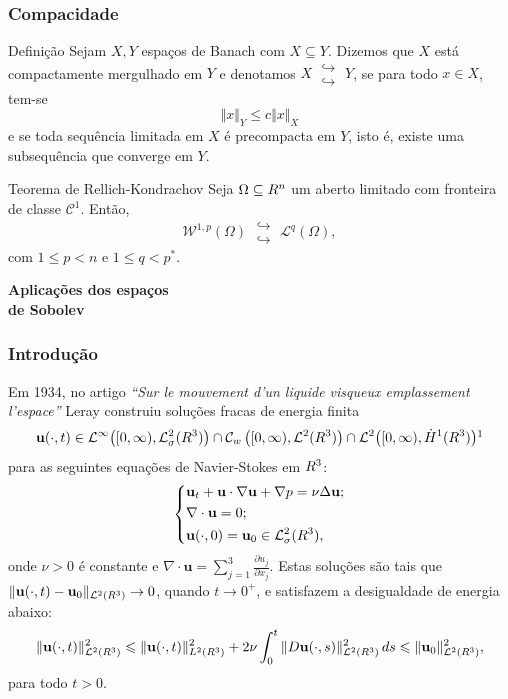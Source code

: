\documentclass[xcolor=dvipsnames, aspectratio=169, 10pt]{beamer}
\let\mathbb\relax
\newcommand{\bR}{\mathbb{R}}
\newcommand{\bu}{\mathbf{u}}
\newcommand{\cC}{\mathcal{C}}
\newcommand{\cL}{\mathcal{L}}
\newcommand{\cW}{\mathcal{W}}
\newcommand{\doublehookrightarrow}{\;\substack{\hookrightarrow \\ \hookrightarrow}\;}
\begin{document}
\begin{frame}
    \frametitle{Compacidade}
    \begin{block}{Definição}
        Sejam $X, Y$ espaços de Banach com $X \subseteq Y$. Dizemos que $X$ está compactamente mergulhado em $Y$ e denotamos $X \doublehookrightarrow Y$,
        se para todo $x \in X$, tem-se
        \[
            \Vert x \Vert_{Y} \leqslant c \Vert x \Vert_X
        \]
        e se toda sequência limitada em $X$ é precompacta em $Y$, isto é, existe uma subsequência que converge em $Y$.
    \end{block} \pause

    \begin{block}{Teorema de Rellich-Kondrachov}
        Seja $\Omega \subseteq \bR^n$ um aberto limitado com fronteira de classe $\cC^1$.
        Então,
        \[
            \cW^{1,p}(\Omega) \doublehookrightarrow \cL^q(\Omega),
        \]
        com $1 \leqslant p < n$ e $1 \leqslant q < p^*$.
    \end{block}
\end{frame}
\begin{frame}
    \begin{center}
        \huge\bfseries Aplicações dos espaços\\de Sobolev
    \end{center}
\end{frame}
\begin{frame}
    \frametitle{Introdução}
    Em 1934, no artigo \textit{``Sur le mouvement d'un liquide visqueux emplassement l'espace''} Leray construiu soluções fracas de energia finita
    \begin{equation} \label{eq:solucao-leray}
        \bu(\cdot,t) \in \cL^\infty\big([0,\infty), \cL^2_\sigma(\bR^3)\big) \cap \cC_w\left([0,\infty), \cL^2(\bR^3)\right) \cap \cL^2\big([0,\infty), \dot H^1(\bR^3)\big)\footnotemark
    \end{equation}
    para as seguintes equações de Navier-Stokes em $\bR^3$: 
    \begin{equation} \label{eq:navierstokes}
        \left\{
            \begin{aligned}
            &\bu_t + \bu \cdot \nabla \bu + \nabla p = \nu \Delta\bu;\\
            &\nabla\cdot\bu = 0;\\
            &\bu(\cdot,0) = \bu_0 \in \cL^2_\sigma(\bR^3),
            \end{aligned}
        \right.
    \end{equation}
    onde $\nu > 0$ é constante e $\nabla \cdot \bu = \sum_{j=1}^3 \frac{\partial u_j}{\partial x_j}$.
    Estas soluções são tais que $\Vert \bu(\cdot,t) - \bu_0 \Vert_{\cL^2(\bR^3)} \to 0$, quando $t \to 0^+$, e satisfazem a desigualdade de energia abaixo:
    \begin{equation} \label{eq:desigualdade-de-energia}
        \Vert \bu(\cdot,t) \Vert_{\cL^2(\bR^3)}^2 \leqslant \Vert \bu(\cdot,t) \Vert_{L^2(\bR^3)}^2 + 2\nu \int_0^t \Vert D\bu(\cdot,s) \Vert_{\cL^2(\bR^3)}^2 \,ds \leqslant \Vert \bu_0 \Vert_{\cL^2(\bR^3)}^2,
    \end{equation}
    para todo $t > 0$.
\end{frame}
\end{document}
